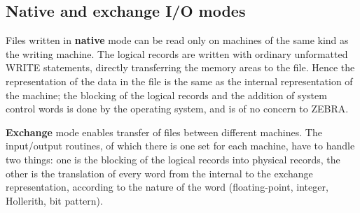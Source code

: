 \subsection{Native and exchange I/O modes}
\par Files written in {\bf native} mode can be read only on machines
of the same kind as the writing machine.
The logical records are written with ordinary unformatted WRITE
statements,
directly transferring the memory areas to the file.
Hence the representation of the data in the file is the same as
the internal representation of the machine;
the blocking of the logical records and the addition of
system control words
is done by the operating system,
and is of no concern to ZEBRA.
\par {\bf Exchange} mode enables transfer of files between different
machines. The input/output routines, of which there is
one set for each machine, have to handle two things:
one is the blocking of the logical records into physical records,
the other is the translation of every word from the internal
to the exchange representation,
according to the nature of the word
(floating-point, integer, Hollerith, bit pattern).

